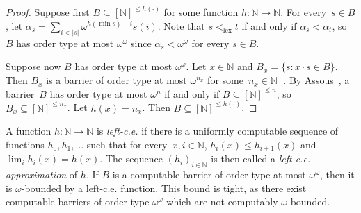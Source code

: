 \documentclass[10pt,a4paper]{article}
\newcommand{\NN}[0]{\mathbb{N}}
\newcommand{\lex}{\mathrm{lex}}
\newcommand{\base}{\operatorname{base}}
\numberwithin{theorem}{section}
\newtheorem{lemma}[theorem]{Lemma}
\begin{document}
\begin{proof}
Suppose first $B \subseteq [\NN]^{\leq h(\cdot)}$ for some function $h : \NN \to \NN$.
For every~$s \in B$, let $\alpha_s = \sum_{i < |s|} \omega^{h(\min s)-i} s(i)$. %
Note that $s <_{\lex} t$ if and only if $\alpha_s < \alpha_t$, so $B$ has order type at most $\omega^\omega$ since $\alpha_s < \omega^{\omega}$ for every $s \in B$.

Suppose now $B$ has order type at most $\omega^{\omega}$. Let $x \in \NN$ and $B_x = \{ s : x \cdot s \in B \}$. Then $B_x$ is a barrier of order type at most $\omega^{n_x}$ for some~$n_x \in \NN^+$. By Assous~\cite[Proposition II.1]{assous1974caracterisation}, a barrier~$B$ has order type at most $\omega^n$ if and only if $B \subseteq [\NN]^{\leq n}$, so $B_x \subseteq [\NN]^{\leq n_x}$. Let $h(x) = n_x$. Then $B \subseteq [\NN]^{\leq h(\cdot)}$.
\end{proof}

A function $h : \NN \to \NN$ is \emph{left-c.e.} if there is a uniformly computable sequence of functions $h_0, h_1, \dots$ such that for every~$x, i \in \NN$, $h_i(x) \leq h_{i+1}(x)$ and $\lim_i h_i(x) = h(x)$. The sequence $(h_i)_{i\in\NN}$ is then called a \emph{left-c.e. approximation} of $h$.
If $B$ is a computable barrier of order type at most $\omega^\omega$, then it is $\omega$-bounded by a left-c.e. function. This bound is tight, as there exist computable barriers of order type $\omega^{\omega}$ which are not computably $\omega$-bounded.


\end{document}
